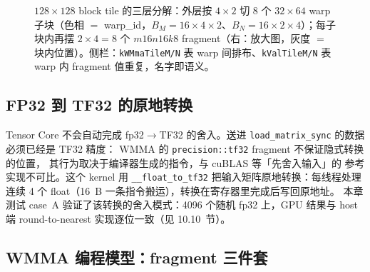 \begin{figure}[H]
\caption{$128\times128$ block tile 的三层分解：外层按 $4\times2$ 切 8 个 $32\times64$ warp 子块（色相 $=$ warp\_id，$B_M = 16\times4\times2$、$B_N = 16\times2\times4$）；每子块内再摆 $2\times4=8$ 个 $m16n16k8$ fragment（右：放大图，灰度 $=$ 块内位置）。侧栏：\texttt{kWMmaTileM/N} 表 warp 间排布、\texttt{kValTileM/N} 表 warp 内 fragment 值重复，名字即语义。}
\label{fig:10-wmma-hierarchy}
\end{figure}

\subsection{FP32 到 TF32 的原地转换}



Tensor Core 不会自动完成 fp32$\to$TF32 的舍入。送进
\texttt{load\_\allowbreak{}matrix\_\allowbreak{}sync} 的数据必须已经是 TF32 精度：
WMMA 的 \texttt{precision::\allowbreak{}tf32} fragment 不保证隐式转换的位置，
其行为取决于编译器生成的指令，与 cuBLAS 等「先舍入输入」的
参考实现不可比。这个 kernel 用
\texttt{\_\allowbreak{}\_\allowbreak{}float\_\allowbreak{}to\_\allowbreak{}tf32} 把输入矩阵原地转换：每线程处理连续
4 个 float（16~B 一条指令搬运），转换在寄存器里完成后写回原地址。
本章测试 case~A 验证了该转换的舍入模式：4096 个随机 fp32 上，GPU 结果与
host 端 round-to-nearest 实现逐位一致（见 10.10~节）。

\subsection{WMMA 编程模型：fragment 三件套}

